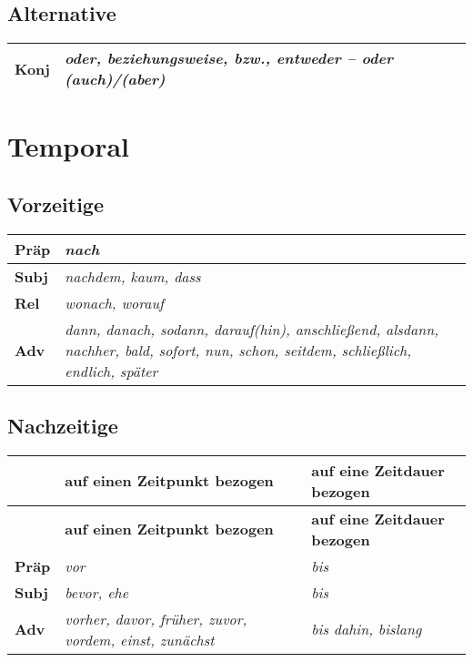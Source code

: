 \documentclass[UTF8]{report}
\begin{document}
\subsection{Alternative}

\begin{longtable}{|>{\raggedright\arraybackslash}p{1cm}|>{\raggedright\arraybackslash}p{12cm}|}
\hline
\textbf{Konj} & \textit{oder, beziehungsweise, bzw., entweder -- oder (auch)/(aber)}\\
\hline
\end{longtable}

\section{Temporal}
\subsection{Vorzeitige}
\begin{longtable}{|>{\raggedright\arraybackslash}p{1cm}|>{\raggedright\arraybackslash}p{12cm}|}

\hline
\textbf{Präp} & \textit{nach} \\
\hline
\textbf{Subj} & \textit{nachdem, kaum, dass} \\
\hline
\textbf{Rel} & \textit{wonach, worauf} \\
\hline
\textbf{Adv} & \textit{dann, danach, sodann, darauf(hin), anschließend, alsdann, nachher, bald, sofort, nun, schon, seitdem, schließlich, endlich, später} \\
\hline

\end{longtable}

\subsection{Nachzeitige}
\begin{longtable}{|>{\raggedright\arraybackslash}p{1cm}|>{\raggedright\arraybackslash}p{5.5cm}|>{\raggedright\arraybackslash}p{5.5cm}|}
\hline
\textbf{} & \textbf{auf einen Zeitpunkt bezogen} & \textbf{auf eine Zeitdauer bezogen} \\
\hline
\endfirsthead

\hline
\textbf{} & \textbf{auf einen Zeitpunkt bezogen} & \textbf{auf eine Zeitdauer bezogen} \\
\hline
\endhead

\textbf{Präp} & \textit{vor} & \textit{bis} \\
\hline
\textbf{Subj} & \textit{bevor, ehe} & \textit{bis} \\
\hline
\textbf{Adv} & \textit{vorher, davor, früher, zuvor, vordem, einst, zunächst} & \textit{bis dahin, bislang} \\
\hline

\end{longtable}
\end{document}
